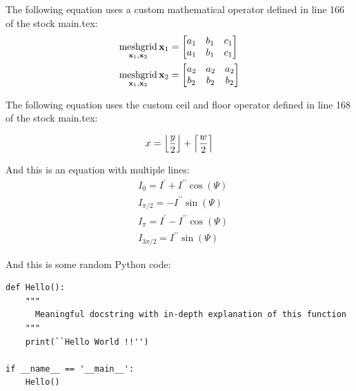 The following equation uses a custom mathematical operator defined in line 166 of the stock main.tex:
\begin{equation}
\begin{aligned}
			\meshgrid_{\mathbf{x}_{1},\mathbf{x}_{2}}\mathbf{x}_{1}&=\begin{bmatrix}a_{1} & b_{1} & c_{1}\\
a_{1} & b_{1} & c_{1}
\end{bmatrix}\\
			\meshgrid_{\mathbf{x}_{1},\mathbf{x}_{2}}\mathbf{x}_{2}&=\begin{bmatrix}a_{2} & a_{2} & a_{2}\\
b_{2} & b_{2} & b_{2}
\end{bmatrix}
\end{aligned}
\end{equation}

The following equation uses the custom ceil and floor operator defined in line 168 of the stock main.tex:

\begin{equation}
x = \floor*{\frac{y}{2}} + \ceil*{\frac{w}{2}}
\end{equation}


And this is an equation with multiple lines:
\begin{equation}
\begin{aligned}
&I_{0}=I^{\prime}+I^{\prime\prime}\cos(\varPsi)   \\
&I_{\pi/2}=-I^{\prime\prime}\sin(\varPsi)                \\
&I_{\pi}=I^{\prime}-I^{\prime\prime}\cos(\varPsi)   \\
&I_{3\pi/2}=I^{\prime\prime}\sin(\varPsi)
\end{aligned}
\end{equation}

And this is some random Python code:


\begin{lstlisting}[style = Python]
def Hello():
    """
      Meaningful docstring with in-depth explanation of this function
    """
    print(``Hello World !!'')

if __name__ == '__main__':
    Hello()
\end{lstlisting}